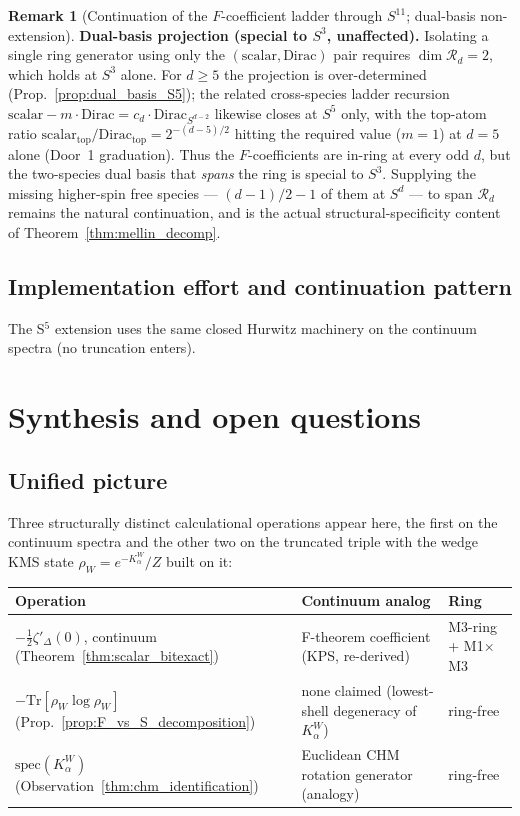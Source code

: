 \documentclass[11pt,a4paper]{article}
\theoremstyle{plain}
\theoremstyle{definition}
\newtheorem{remark}[theorem]{Remark}
\newcommand{\Tr}{\mathrm{Tr}}
\newcommand{\Kalpha}{K_{\alpha}^{W}}
\newcommand{\rhoW}{\rho_{W}}
\begin{document}
\begin{remark}[Continuation of the $F$-coefficient ladder through $S^{11}$; dual-basis non-extension]
\textbf{Dual-basis projection (special to $S^{3}$, unaffected).} Isolating
a single ring generator using only the $(\text{scalar}, \text{Dirac})$ pair
requires $\dim \mathcal{R}_{d} = 2$, which holds at $S^{3}$ alone. For
$d \ge 5$ the projection is over-determined
(Prop.~\ref{prop:dual_basis_S5}); the related cross-species ladder
recursion
$\mathrm{scalar} - m \cdot \mathrm{Dirac} = c_{d} \cdot \mathrm{Dirac}_{S^{d-2}}$
likewise closes at $S^{5}$ only, with the top-atom ratio
$\mathrm{scalar}_{\mathrm{top}}/\mathrm{Dirac}_{\mathrm{top}} =
2^{-(d-5)/2}$ hitting the required value ($m = 1$) at $d = 5$ alone
(Door~1 graduation). Thus the $F$-coefficients are in-ring at every odd
$d$, but the two-species dual basis that \emph{spans} the ring is special
to $S^{3}$. Supplying the missing higher-spin free species ---
$(d-1)/2 - 1$ of them at $S^{d}$ --- to span $\mathcal{R}_{d}$ remains the
natural continuation, and is the actual structural-specificity content of
Theorem~\ref{thm:mellin_decomp}.
\end{remark}

\subsection{Implementation effort and continuation pattern}

The S$^{5}$ extension uses the same closed Hurwitz machinery on the
continuum spectra (no truncation enters). 

\section{Synthesis and open questions}
\label{sec:synthesis}

\subsection{Unified picture}

Three structurally distinct calculational operations appear here, the
first on the continuum spectra and the other two on the truncated triple
with the wedge KMS state $\rhoW = e^{-\Kalpha}/Z$ built on it:

\begin{center}
\begin{tabular}{lll}
\toprule
Operation & Continuum analog & Ring \\
\midrule
$-\tfrac{1}{2}\zeta'_{\Delta}(0)$, continuum (Theorem~\ref{thm:scalar_bitexact}) & F-theorem coefficient (KPS, re-derived) & M3-ring + M1$\times$M3 \\
$-\Tr[\rhoW \log \rhoW]$ (Prop.~\ref{prop:F_vs_S_decomposition}) & none claimed (lowest-shell degeneracy of $\Kalpha$) & ring-free \\
$\mathrm{spec}(\Kalpha)$ (Observation~\ref{thm:chm_identification}) & Euclidean CHM rotation generator (analogy) & ring-free \\
\bottomrule
\end{tabular}
\end{center}
\end{document}

